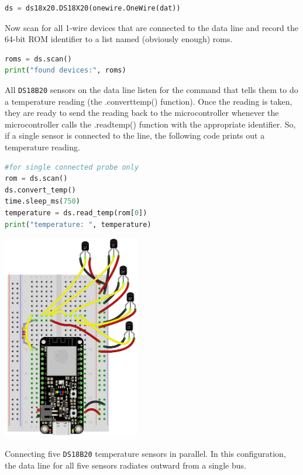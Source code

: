 \begin{lstlisting}[language=Python]
ds = ds18x20.DS18X20(onewire.OneWire(dat))
\end{lstlisting}

Now scan for all 1-wire devices that are connected to the data line and record the 64-bit ROM identifier to a list named (obviously enough) roms.

\begin{lstlisting}[language=Python]
roms = ds.scan()
print("found devices:", roms)
\end{lstlisting}

All  \texttt{DS18B20} sensors on the data line listen for the command that tells them to do a temperature reading (the .convert\textunderscore temp() function).
Once the reading is taken, they are ready to send the reading back to the microcontroller whenever the microcontroller calls the .read\textunderscore temp() function with the appropriate identifier. 
So, if a single sensor is connected to the line, the following code prints out a temperature reading.

\begin{lstlisting}[language=Python]
#for single connected probe only
rom = ds.scan()
ds.convert_temp()
time.sleep_ms(750)
temperature = ds.read_temp(rom[0])
print("temperature: ", temperature)
\end{lstlisting}

\begin{marginfigure}[-2cm]
	\begin{center}
		\includegraphics[height=9cm]{Images/fiveDS18B20.png}
		\caption[Five DS18B20 on breadboard]{Connecting five \texttt{DS18B20} temperature sensors in parallel. In this configuration, the data line for all five sensors radiates outward from a single bus.}
	\end{center}
\end{marginfigure}

